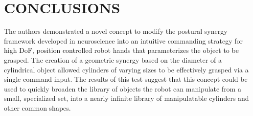 \documentclass[runningheads,a4paper]{llncs}
\begin{document}

 
\section{CONCLUSIONS}

The authors demonstrated a novel concept to modify the postural synergy framework developed in neuroscience into an intuitive commanding strategy for high DoF, position controlled robot hands that parameterizes the object to be grasped. The creation of a geometric synergy based on the diameter of a cylindrical object allowed cylinders of varying sizes to be effectively grasped via a single command input. The results of this test suggest that this concept could be used to quickly broaden the library of objects the robot can manipulate from a small, specialized set, into a nearly infinite library of manipulatable cylinders and other common shapes. 




\end{document}
